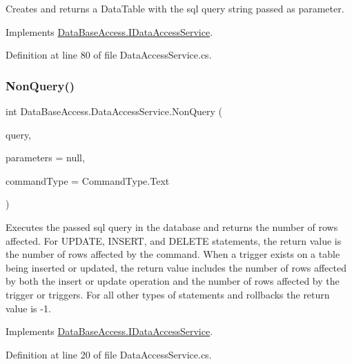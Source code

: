Creates and returns a Data\+Table with the sql query string passed as parameter. 



Implements \mbox{\hyperlink{interfaceDataBaseAccess_1_1IDataAccessService_aaaa5bc38c85e15cac8b29e1df1e09638}{Data\+Base\+Access.\+I\+Data\+Access\+Service}}.



Definition at line 80 of file Data\+Access\+Service.\+cs.

\mbox{\label{classDataBaseAccess_1_1DataAccessService_ac0ccfab11b8a047d85096cdf188e8e2f}} 
\subsubsection{\texorpdfstring{NonQuery()}{NonQuery()}}
{\footnotesize\ttfamily int Data\+Base\+Access.\+Data\+Access\+Service.\+Non\+Query (\begin{DoxyParamCaption}\item[{string}]{query,  }\item[{Dictionary$<$ string, object $>$}]{parameters = {\ttfamily null},  }\item[{Command\+Type}]{command\+Type = {\ttfamily CommandType.Text} }\end{DoxyParamCaption})}



Executes the passed sql query in the database and returns the number of rows affected. For U\+P\+D\+A\+TE, I\+N\+S\+E\+RT, and D\+E\+L\+E\+TE statements, the return value is the number of rows affected by the command. When a trigger exists on a table being inserted or updated, the return value includes the number of rows affected by both the insert or update operation and the number of rows affected by the trigger or triggers. For all other types of statements and rollbacks the return value is -\/1. 



Implements \mbox{\hyperlink{interfaceDataBaseAccess_1_1IDataAccessService_a2fb8cf4238c955d7884bdb405bef50e1}{Data\+Base\+Access.\+I\+Data\+Access\+Service}}.



Definition at line 20 of file Data\+Access\+Service.\+cs.

